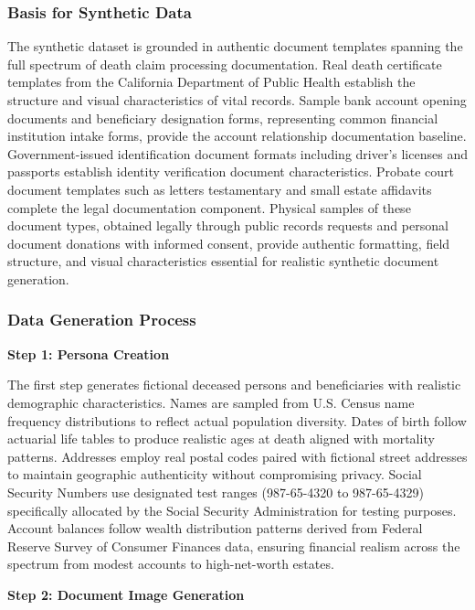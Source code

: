 \subsubsection{Basis for Synthetic Data}

The synthetic dataset is grounded in authentic document templates spanning the full spectrum of death claim processing documentation. Real death certificate templates from the California Department of Public Health establish the structure and visual characteristics of vital records. Sample bank account opening documents and beneficiary designation forms, representing common financial institution intake forms, provide the account relationship documentation baseline. Government-issued identification document formats including driver's licenses and passports establish identity verification document characteristics. Probate court document templates such as letters testamentary and small estate affidavits complete the legal documentation component. Physical samples of these document types, obtained legally through public records requests and personal document donations with informed consent, provide authentic formatting, field structure, and visual characteristics essential for realistic synthetic document generation.

\subsubsection{Data Generation Process}

\textbf{Step 1: Persona Creation}

The first step generates fictional deceased persons and beneficiaries with realistic demographic characteristics. Names are sampled from U.S. Census name frequency distributions to reflect actual population diversity. Dates of birth follow actuarial life tables to produce realistic ages at death aligned with mortality patterns. Addresses employ real postal codes paired with fictional street addresses to maintain geographic authenticity without compromising privacy. Social Security Numbers use designated test ranges (987-65-4320 to 987-65-4329) specifically allocated by the Social Security Administration for testing purposes. Account balances follow wealth distribution patterns derived from Federal Reserve Survey of Consumer Finances data, ensuring financial realism across the spectrum from modest accounts to high-net-worth estates.

\textbf{Step 2: Document Image Generation}

